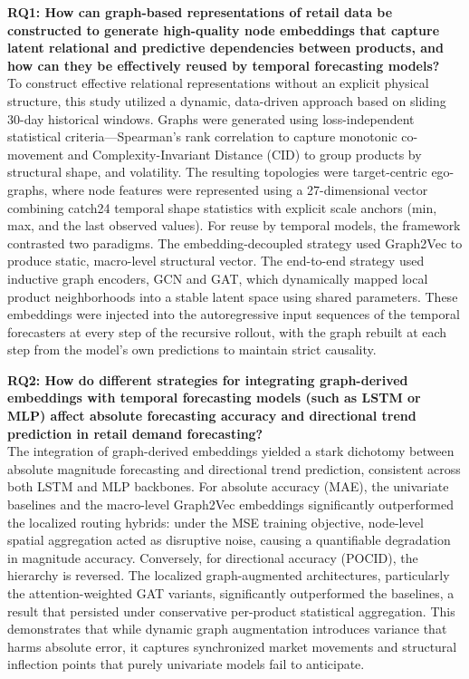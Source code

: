 \textbf{RQ1: How can graph-based representations of retail data be constructed to
generate high-quality node embeddings that capture latent relational and
predictive dependencies between products, and how can they be effectively reused
by temporal forecasting models?} \\
To construct effective relational representations without an explicit physical
structure, this study utilized a dynamic, data-driven approach based on sliding
30-day historical windows. Graphs were generated using loss-independent
statistical criteria---Spearman's rank correlation to capture monotonic
co-movement and Complexity-Invariant Distance (CID) to group products by
structural shape, and volatility. The resulting topologies were target-centric
ego-graphs, where node features were represented using a 27-dimensional vector
combining catch24 temporal shape statistics with explicit scale anchors (min, max,
and the last observed values). For reuse by temporal models, the framework contrasted
two paradigms. The embedding-decoupled strategy used Graph2Vec to produce static,
macro-level structural vector. The end-to-end strategy used inductive graph
encoders, GCN and GAT, which dynamically mapped local product neighborhoods into a
stable latent space using shared parameters. These embeddings were injected into
the autoregressive input sequences of the temporal forecasters at every step of
the recursive rollout, with the graph rebuilt at each step from the model's own
predictions to maintain strict causality.

\textbf{RQ2: How do different strategies for integrating graph-derived embeddings
with temporal forecasting models (such as LSTM or MLP) affect absolute forecasting
accuracy and directional trend prediction in retail demand forecasting?} \\
The integration of graph-derived embeddings yielded a stark dichotomy between
absolute magnitude forecasting and directional trend prediction, consistent across
both LSTM and MLP backbones. For absolute accuracy (MAE), the univariate baselines
and the macro-level Graph2Vec embeddings significantly outperformed the localized
routing hybrids: under the MSE training objective, node-level spatial aggregation
acted as disruptive noise, causing a quantifiable degradation in magnitude
accuracy. Conversely, for directional accuracy (POCID), the hierarchy is reversed.
The localized graph-augmented architectures, particularly the attention-weighted
GAT variants, significantly outperformed the baselines, a result that persisted
under conservative per-product statistical aggregation. This demonstrates that
while dynamic graph augmentation introduces variance that harms absolute error, it
captures synchronized market movements and structural inflection points that purely
univariate models fail to anticipate.

